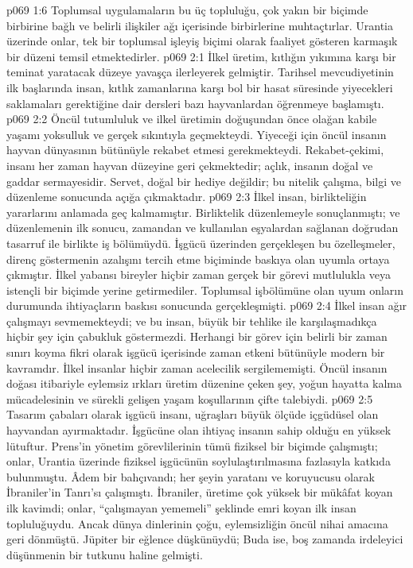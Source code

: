 \vs p069 1:6 Toplumsal uygulamaların bu üç topluluğu, çok yakın bir biçimde birbirine bağlı ve belirli ilişkiler ağı içerisinde birbirlerine muhtaçtırlar. Urantia üzerinde onlar, tek bir toplumsal işleyiş biçimi olarak faaliyet gösteren karmaşık bir düzeni temsil etmektedirler.
\vs p069 2:1 İlkel üretim, kıtlığın yıkımına karşı bir teminat yaratacak düzeye yavaşça ilerleyerek gelmiştir. Tarihsel mevcudiyetinin ilk başlarında insan, kıtlık zamanlarına karşı bol bir hasat süresinde yiyecekleri saklamaları gerektiğine dair dersleri bazı hayvanlardan öğrenmeye başlamıştı.
\vs p069 2:2 Öncül tutumluluk ve ilkel üretimin doğuşundan önce olağan kabile yaşamı yoksulluk ve gerçek sıkıntıyla geçmekteydi. Yiyeceği için öncül insanın hayvan dünyasının bütünüyle rekabet etmesi gerekmekteydi. Rekabet\hyp{}çekimi, insanı her zaman hayvan düzeyine geri çekmektedir; açlık, insanın doğal ve gaddar sermayesidir. Servet, doğal bir hediye değildir; bu nitelik çalışma, bilgi ve düzenleme sonucunda açığa çıkmaktadır.
\vs p069 2:3 İlkel insan, birlikteliğin yararlarını anlamada geç kalmamıştır. Birliktelik düzenlemeyle sonuçlanmıştı; ve düzenlemenin ilk sonucu, zamandan ve kullanılan eşyalardan sağlanan doğrudan tasarruf ile birlikte iş bölümüydü. İşgücü üzerinden gerçekleşen bu özelleşmeler, direnç göstermenin azalışını tercih etme biçiminde baskıya olan uyumla ortaya çıkmıştır. İlkel yabansı bireyler hiçbir zaman gerçek bir görevi mutlulukla veya istençli bir biçimde yerine getirmediler. Toplumsal işbölümüne olan uyum onların durumunda ihtiyaçların baskısı sonucunda gerçekleşmişti.
\vs p069 2:4 İlkel insan ağır çalışmayı sevmemekteydi; ve bu insan, büyük bir tehlike ile karşılaşmadıkça hiçbir şey için çabukluk göstermezdi. Herhangi bir görev için belirli bir zaman sınırı koyma fikri olarak işgücü içerisinde zaman etkeni bütünüyle modern bir kavramdır. İlkel insanlar hiçbir zaman acelecilik sergilememişti. Öncül insanın doğası itibariyle eylemsiz ırkları üretim düzenine çeken şey, yoğun hayatta kalma mücadelesinin ve sürekli gelişen yaşam koşullarının çifte talebiydi.
\vs p069 2:5 Tasarım çabaları olarak işgücü insanı, uğraşları büyük ölçüde içgüdüsel olan hayvandan ayırmaktadır. İşgücüne olan ihtiyaç insanın sahip olduğu en yüksek lütuftur. Prens’in yönetim görevlilerinin tümü fiziksel bir biçimde çalışmıştı; onlar, Urantia üzerinde fiziksel işgücünün soylulaştırılmasına fazlasıyla katkıda bulunmuştu. Âdem bir bahçıvandı; her şeyin yaratanı ve koruyucusu olarak İbraniler’in Tanrı’sı çalışmıştı. İbraniler, üretime çok yüksek bir mükâfat koyan ilk kavimdi; onlar, “çalışmayan yememeli” şeklinde emri koyan ilk insan topluluğuydu. Ancak dünya dinlerinin çoğu, eylemsizliğin öncül nihai amacına geri dönmüştü. Jüpiter bir eğlence düşkünüydü; Buda ise, boş zamanda irdeleyici düşünmenin bir tutkunu haline gelmişti.
